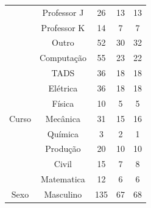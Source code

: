 \begin{table}[ht]
\begin{tabular}{ccccc}
                                        & Professor J              & 26                                        & 13                   & 13                              \\
                                        & Professor K              & 14                                        & 7                    & 7                               \\
                                        & Outro                    & 52                                        & 30                   & 32                              \\
  \hline
  \multirow{9}{*}{Curso}                & Computação               & 55                                        & 23                   & 22                              \\
                                        & TADS                     & 36                                        & 18                   & 18                              \\
                                        & Elétrica                 & 36                                        & 18                   & 18                              \\
                                        & Física                   & 10                                        & 5                    & 5                               \\
                                        & Mecânica                 & 31                                        & 15                   & 16                              \\
                                        & Química                  & 3                                         & 2                    & 1                               \\
                                        & Produção                 & 20                                        & 10                   & 10                              \\
                                        & Civil                    & 15                                        & 7                    & 8                               \\
                                        & Matematica               & 12                                        & 6                    & 6                               \\
  \hline
  \multirow{3}{*}{Sexo}                 & Masculino                & 135                                       & 67                   & 68                              \\

\end{tabular}
\end{table}
